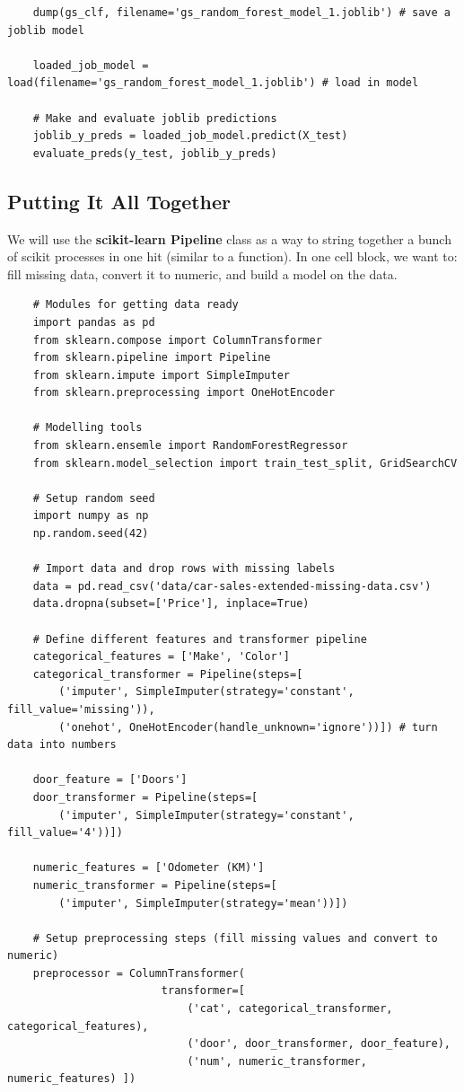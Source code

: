 \documentclass[11pt, a4paper]{article}
\begin{document}
\begin{spacing}{1.1}
\begin{lstlisting}
	dump(gs_clf, filename='gs_random_forest_model_1.joblib') # save a joblib model
	
	loaded_job_model = load(filename='gs_random_forest_model_1.joblib') # load in model
	
	# Make and evaluate joblib predictions
	joblib_y_preds = loaded_job_model.predict(X_test)
	evaluate_preds(y_test, joblib_y_preds) \end{lstlisting} \newpage

	\subsection{Putting It All Together}
	We will use the \textbf{scikit-learn Pipeline} class as a way to string together a bunch of scikit processes in one hit (similar to a function). In one cell block, we want to: fill missing data, convert it to numeric, and build a model on the data. 
	\begin{lstlisting}	
	# Modules for getting data ready
	import pandas as pd
	from sklearn.compose import ColumnTransformer
	from sklearn.pipeline import Pipeline
	from sklearn.impute import SimpleImputer
	from sklearn.preprocessing import OneHotEncoder
	
	# Modelling tools
	from sklearn.ensemle import RandomForestRegressor
	from sklearn.model_selection import train_test_split, GridSearchCV
	
	# Setup random seed
	import numpy as np
	np.random.seed(42)
	
	# Import data and drop rows with missing labels
	data = pd.read_csv('data/car-sales-extended-missing-data.csv')
	data.dropna(subset=['Price'], inplace=True)
	
	# Define different features and transformer pipeline
	categorical_features = ['Make', 'Color']
	categorical_transformer = Pipeline(steps=[
		('imputer', SimpleImputer(strategy='constant', fill_value='missing')),
		('onehot', OneHotEncoder(handle_unknown='ignore'))]) # turn data into numbers
	
	door_feature = ['Doors']
	door_transformer = Pipeline(steps=[
		('imputer', SimpleImputer(strategy='constant', fill_value='4'))])
	
	numeric_features = ['Odometer (KM)']
	numeric_transformer = Pipeline(steps=[
		('imputer', SimpleImputer(strategy='mean'))])
	
	# Setup preprocessing steps (fill missing values and convert to numeric)
	preprocessor = ColumnTransformer(
	                    transformer=[
	                    	('cat', categorical_transformer, categorical_features),
	                    	('door', door_transformer, door_feature),
	                    	('num', numeric_transformer, numeric_features) ])
	

\end{lstlisting}
\end{spacing}
\end{document}
